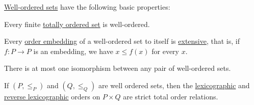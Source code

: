 \begin{proposition}\label{thm:def:well_ordered_set}
  \hyperref[def:well_ordered_set]{Well-ordered sets} have the following basic properties:
  \begin{thmenum}
     Every finite \hyperref[def:totally_ordered_set]{totally ordered set} is well-ordered.

     Every \hyperref[def:partially_ordered_set/morphism]{order embedding} of a well-ordered set to itself is \hyperref[def:extensive_function]{extensive}, that is, if \( f: P \to P \) is an embedding, we have \( x \leq f(x) \) for every \( x \).

     There is at most one isomorphism between any pair of well-ordered sets.

     If \( (P, \leq_P) \) and \( (Q, \leq_Q) \) are well ordered sets, then the \hyperref[eq:def:lexicographic_order]{lexicographic} and \hyperref[eq:def:lexicographic_order/reverse]{reverse lexicographic} orders on \( P \times Q \) are strict total order relations.
  \end{thmenum}
\end{proposition}
